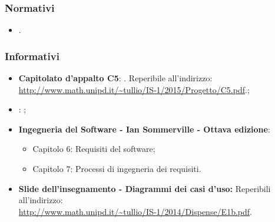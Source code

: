 \subsubsection{Normativi}
\begin{itemize}
\item \textit{\NdPvDue}. 
\end{itemize}

\subsubsection{Informativi}
\begin{itemize}
	\item
	\textbf{Capitolato d'appalto C5}: \progetto. Reperibile all'indirizzo: \\
	\url{http://www.math.unipd.it/~tullio/IS-1/2015/Progetto/C5.pdf}.;
	\item
	\textbf{\SdF}: \textit{\SdFv};
	\item
	\textbf{Ingegneria del Software - Ian Sommerville - Ottava edizione}:
	\begin{itemize}
		\item Capitolo 6: Requisiti del software;
		\item Capitolo 7: Processi di ingegneria dei requisiti.
	\end{itemize} 
	\item
	\textbf{Slide dell’insegnamento - Diagrammi dei casi d’uso:}  Reperibili all'indirizzo: \\ \url{http://www.math.unipd.it/~tullio/IS-1/2014/Dispense/E1b.pdf}.
\end{itemize}